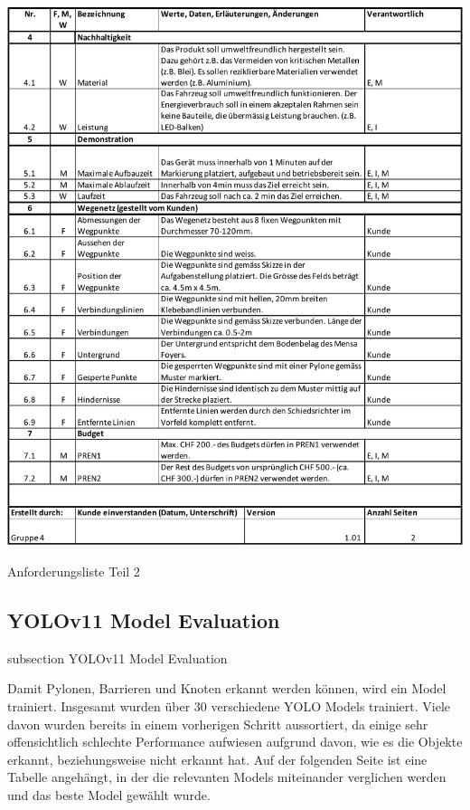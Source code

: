\begin{table}[H]
\centering
\includegraphics[width=\textwidth]{assets/projektmanagement/Anforderungsliste_V1.01_page2.pdf}
\caption{Anforderungsliste Teil 2}
\label{table:anforderungsliste_page2}
\end{table}
\newpage



\subsection*{YOLOv11 Model Evaluation}\label{model-evaluation}
    {subsection}
    {YOLOv11 Model Evaluation}

Damit Pylonen, Barrieren und Knoten erkannt werden können, wird ein Model trainiert. Insgesamt wurden über 30 verschiedene YOLO Models trainiert. Viele davon wurden bereits in einem vorherigen Schritt aussortiert, da einige sehr offensichtlich schlechte Performance aufwiesen aufgrund davon, wie es die Objekte erkannt, beziehungsweise nicht erkannt hat. Auf der folgenden Seite ist eine Tabelle angehängt, in der die relevanten Models miteinander verglichen werden und das beste Model gewählt wurde.

